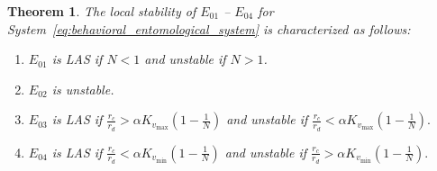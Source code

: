 \documentclass[10pt,a4paper]{amsart}
\newtheorem{theorem}{Theorem}
\begin{document}
\begin{theorem}\label{thm: Game-theoretic Model}
The local stability of $E_{01}$ -- $E_{04}$ for System~\eqref{eq:behavioral_entomological_system} is characterized as follows:
\begin{enumerate}
 \item \( E_{01} \) is LAS if \( N < 1 \) and unstable if \( N > 1 \).
    \item \( E_{02} \) is unstable.
    
    \item $E_{03}$ is LAS if  $\frac{r_c}{r_d} > \alpha K_{v_{\max}}\left(1 - \frac{1}{N}\right)$ and unstable if $\frac{r_c}{r_d} < \alpha K_{v_{\max}}\left(1 - \frac{1}{N}\right).$

    \item $E_{04}$ is LAS if  $\frac{r_c}{r_d} < \alpha K_{v_{\min}}\left(1 - \frac{1}{N}\right)$ and unstable if $\frac{r_c}{r_d} > \alpha K_{v_{\min}}\left(1 - \frac{1}{N}\right).$

    
    
\end{enumerate}
\end{theorem}
\end{document}
